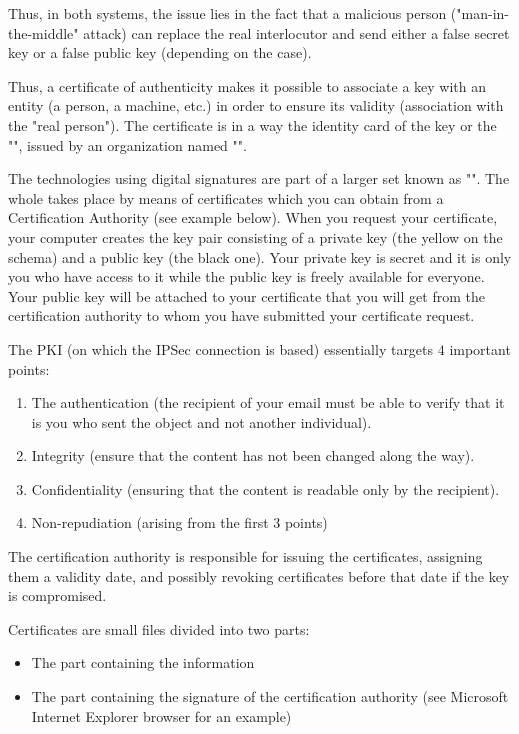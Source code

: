 	Thus, in both systems, the issue lies in the fact that a malicious person ("man-in-the-middle" attack) can replace the real interlocutor and send either a false secret key or a false public key (depending on the case).

	Thus, a certificate of authenticity makes it possible to associate a key with an entity (a person, a machine, etc.) in order to ensure its validity (association with the "real person"). The certificate is in a way the identity card of the key or the "", issued by an organization named "".

	The technologies using digital signatures are part of a larger set known as "". The whole takes place by means of certificates which you can obtain from a Certification Authority (see example below). When you request your certificate, your computer creates the key pair consisting of a private key (the yellow on the schema) and a public key (the black one). Your private key is secret and it is only you who have access to it while the public key is freely available for everyone. Your public key will be attached to your certificate that you will get from the certification authority to whom you have submitted your certificate request.

	The PKI (on which the IPSec connection is based) essentially targets $4$ important points:
	\begin{enumerate}
		\item The authentication (the recipient of your email must be able to verify that it is you who sent the object and not another individual).

		\item Integrity (ensure that the content has not been changed along the way).

		\item Confidentiality (ensuring that the content is readable only by the recipient).

		\item Non-repudiation (arising from the first 3 points)
	\end{enumerate}
	The certification authority is responsible for issuing the certificates, assigning them a validity date, and possibly revoking certificates before that date if the key is compromised.
	
	Certificates are small files divided into two parts:
	\begin{itemize}
		\item The part containing the information
		
		\item The part containing the signature of the certification authority (see Microsoft Internet Explorer browser for an example)
	\end{itemize}

